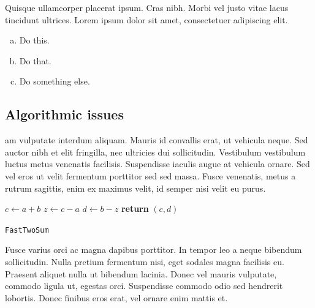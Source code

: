 \documentclass{article}
\begin{document}
\begin{question}
	Quisque ullamcorper placerat ipsum. Cras nibh. Morbi vel justo vitae lacus tincidunt ultrices. Lorem ipsum dolor sit amet, consectetuer adipiscing elit.

	\begin{enumerate}[(a)]
		\item Do this.
		\item Do that.
		\item Do something else.
	\end{enumerate}
\end{question}
	

\subsection{Algorithmic issues}

am vulputate interdum aliquam. Mauris id convallis erat, ut vehicula neque. Sed auctor nibh et elit fringilla, nec ultricies dui sollicitudin. Vestibulum vestibulum luctus metus venenatis facilisis. Suspendisse iaculis augue at vehicula ornare. Sed vel eros ut velit fermentum porttitor sed sed massa. Fusce venenatis, metus a rutrum sagittis, enim ex maximus velit, id semper nisi velit eu purus.

\begin{center}
	\begin{minipage}{0.5\linewidth} %
		\begin{algorithm}[H]
			\medskip
			$c \leftarrow a + b$ \;
			$z \leftarrow c - a$ \;
			$d \leftarrow b - z$ \;
			{\bf return} $(c,d)$ \;
			\caption{\texttt{FastTwoSum}} %
			\label{alg:fastTwoSum}   %
		\end{algorithm}
	\end{minipage}
\end{center}

Fusce varius orci ac magna dapibus porttitor. In tempor leo a neque bibendum sollicitudin. Nulla pretium fermentum nisi, eget sodales magna facilisis eu. Praesent aliquet nulla ut bibendum lacinia. Donec vel mauris vulputate, commodo ligula ut, egestas orci. Suspendisse commodo odio sed hendrerit lobortis. Donec finibus eros erat, vel ornare enim mattis et.
\end{document}
